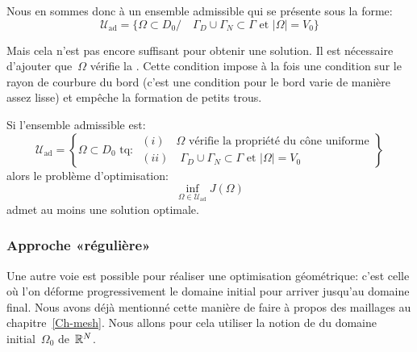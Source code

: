 Nous en sommes donc à un ensemble admissible qui se présente sous la forme:
\begin{equation}
\mathscr{U}_{\text{ad}}=\{ \Omega\subset D_0 /\quad 
\Gamma_D \cup \Gamma_N \subset \Gamma \text{ et } |\Omega|=V_0 \}
\end{equation}

Mais cela n'est pas encore suffisant pour obtenir une solution.
Il est nécessaire d'ajouter que~$\Omega$ vérifie la . Cette condition impose à la fois une condition sur le rayon de courbure du bord (c'est une condition pour le bord varie de manière assez lisse) et empêche la formation de petits trous.

\begin{theoreme}[D. Chenais]
Si l'ensemble admissible est:
\begin{equation}
\mathscr{U}_{\text{ad}}=\left\{ \Omega\subset D_0 \text{ tq: }
\begin{array}{l}
(i)\quad \Omega \text{ vérifie la propriété du cône uniforme}\\
(ii)\quad \Gamma_D \cup \Gamma_N \subset \Gamma \text{ et } |\Omega|=V_0 
\end{array}
\right\}
\end{equation}
alors le problème d'optimisation:
\[ \inf_{\Omega\in\mathscr{U}_{\text{ad}}} J(\Omega) \]
admet au moins une solution optimale.
\end{theoreme}

\medskip
\subsubsection{Approche «régulière»}

Une autre voie est possible pour réaliser une optimisation géométrique: c'est celle où l'on déforme progressivement le domaine initial pour arriver jusqu'au domaine final. Nous avons déjà mentionné cette manière de faire à propos des maillages au chapitre~\ref{Ch-mesh}. Nous allons pour cela utiliser la notion de  du domaine initial~$\Omega_0$ de~$\mathbb R^N$.

